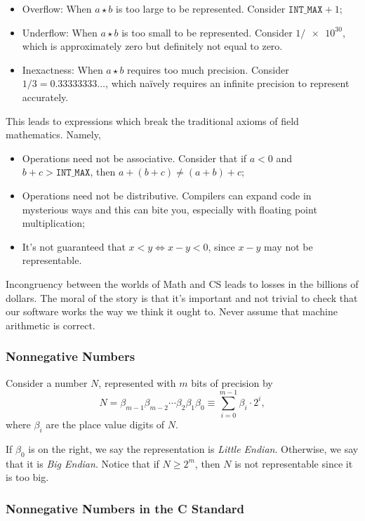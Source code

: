 \begin{itemize}
	\item Overflow: When $a \star b$ is too large to be represented. Consider $\texttt{INT\_MAX} + 1$;
	\item Underflow: When $a \star b$ is too small to be represented. Consider $1 / \num{e30}$, which is approximately zero but definitely not equal to zero. 
	\item Inexactness: When $a \star b$ requires too much precision. Consider $1/3 = 0.33333333\dots$, which naïvely requires an infinite precision to represent accurately.
\end{itemize}

This leads to expressions which break the traditional axioms of field mathematics.
Namely,

\begin{itemize}
\item Operations need not be associative. Consider that if $a < 0$ and $b + c > \texttt{INT\_MAX}$, then $a + (b+c) \not= (a + b) + c$;
\item Operations need not be distributive. Compilers can expand code in mysterious ways and this can bite you, especially with floating point multiplication;
\item It's not guaranteed that $x < y \iff x-y < 0$, since $x-y$ may not be representable.
\end{itemize}

Incongruency between the worlds of Math and CS leads to losses in the billions of dollars.
The moral of the story is that it's important and not trivial to check that our software works the way we think it ought to.
Never assume that machine arithmetic is correct.

\subsubsection*{Nonnegative Numbers}

Consider a number $N$, represented with $m$ bits of precision by
\[ N = \beta_{m-1}\beta_{m-2}\cdots\beta_2\beta_1\beta_0 \equiv \sum_{i=0}^{m-1} \beta_i \cdot 2^i, \]
where $\beta_i$ are the place value digits of $N$.

If $\beta_0$ is on the right, we say the representation is \emph{Little Endian}. Otherwise, we say that it is \emph{Big Endian}. Notice that if $N \geq 2^m$, then $N$ is not representable since it is too big.

\subsubsection*{Nonnegative Numbers in the C Standard}

